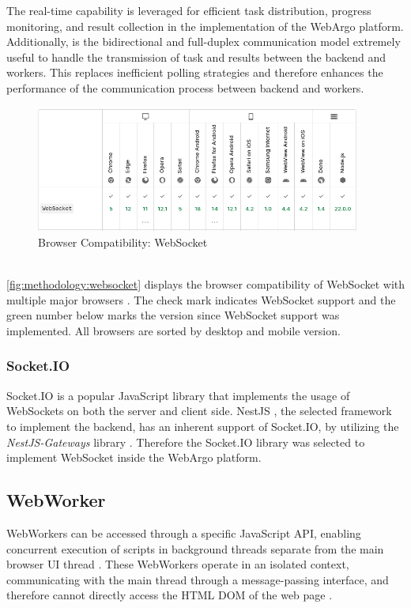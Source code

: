 The real-time capability is leveraged for efficient task distribution, progress monitoring, and result collection in the implementation of the WebArgo platform. Additionally, is the bidirectional and full-duplex communication model extremely useful to handle the transmission of task and results between the backend and workers. This replaces inefficient polling strategies and therefore enhances the performance of the communication process between backend and workers.
\begin{figure}[htbp]
  \centering
  \includegraphics[width=0.95\textwidth]{gfx/figures/websocket-browsercompability.png}
  \caption{Browser Compatibility: WebSocket \cite{methodology:websockets1}}
  \label{fig:methodology:websocket}
\end{figure}
~\\
\autoref{fig:methodology:websocket} displays the browser compatibility of WebSocket with multiple major browsers \cite{methodology:websockets1}. The check mark indicates WebSocket support and the green number below marks the version since WebSocket support was implemented. All browsers are sorted by desktop and mobile version.

\subsubsection{Socket.IO}
Socket.IO \cite{methodology:websockets2} is a popular JavaScript library that implements the usage of WebSockets on both the server and client side. NestJS \cite{methodology:nestjs}, the selected framework to implement the backend, has an inherent support of Socket.IO, by utilizing the \emph{NestJS-Gateways} library \cite{methodology:nestjs}. Therefore the Socket.IO library was selected to implement WebSocket inside the WebArgo platform.

\subsection{WebWorker}
\label{sec:methodology:webworker}
WebWorkers can be accessed through a specific JavaScript \ac{API}, enabling concurrent execution of scripts in background threads separate from the main browser \ac{UI} thread \cite{methodology:webworkers}. These WebWorkers operate in an isolated context, communicating with the main thread through a message-passing interface, and therefore cannot directly access the \acs{HTML} \acs{DOM} of the web page \cite{methodology:webworkers}. 

